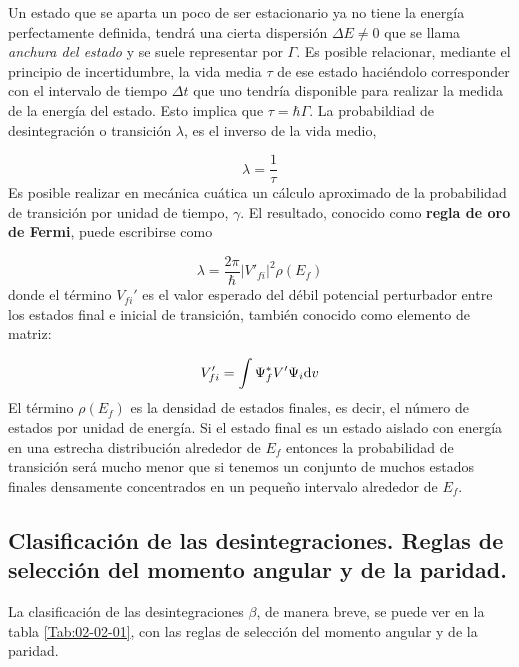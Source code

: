 
Un estado que se aparta un poco de ser estacionario ya no tiene la energía perfectamente definida, tendrá una cierta dispersión $\Delta E \neq 0$ que se llama \textit{anchura del estado} y se suele representar por $\Gamma$. Es posible relacionar, mediante el principio de incertidumbre, la vida media $\tau$ de ese estado haciéndolo corresponder con el intervalo de tiempo $\Delta t$ que uno tendría disponible para realizar la medida de la energía del estado. Esto implica que $\tau=\hbar \Gamma$. La probabildiad de desintegración o transición $\lambda$, es el inverso de la vida medio,

\begin{equation}
	\lambda = \frac{1}{\tau}
\end{equation}
Es posible realizar en mecánica cuática un cálculo aproximado de la probabilidad de transición por unidad de tiempo, $\gamma$. El resultado, conocido como \textbf{regla de oro de Fermi}, puede escribirse como

\begin{equation}
	\lambda = \frac{2\pi}{\hbar} |V'_{fi}|^2 \rho (E_f)	
\end{equation}
donde el término $V_{fi}'$ es el valor esperado del débil potencial perturbador entre los estados final e inicial de transición, también conocido como elemento de matriz:

\begin{equation}
	V_{fi}'= \int \Psi_f^* V' \Psi_i \mathrm{d} v
\end{equation}
El término $\rho(E_f)$ es la densidad de estados finales, es decir, el número de estados por unidad de energía. Si el estado final es un estado aislado con energía en una estrecha distribución alrededor de $E_f$ entonces la probabilidad de transición será mucho menor que si tenemos un conjunto de muchos estados finales densamente concentrados en un pequeño intervalo alrededor de $E_f$.

\Revisar


\subsection{Clasificación de las desintegraciones. Reglas de selección del momento angular y de la paridad.}

La clasificación de las desintegraciones $\beta$, de manera breve, se puede ver en la tabla \ref{Tab:02-02-01}, con las reglas de selección del momento angular y de la paridad.

